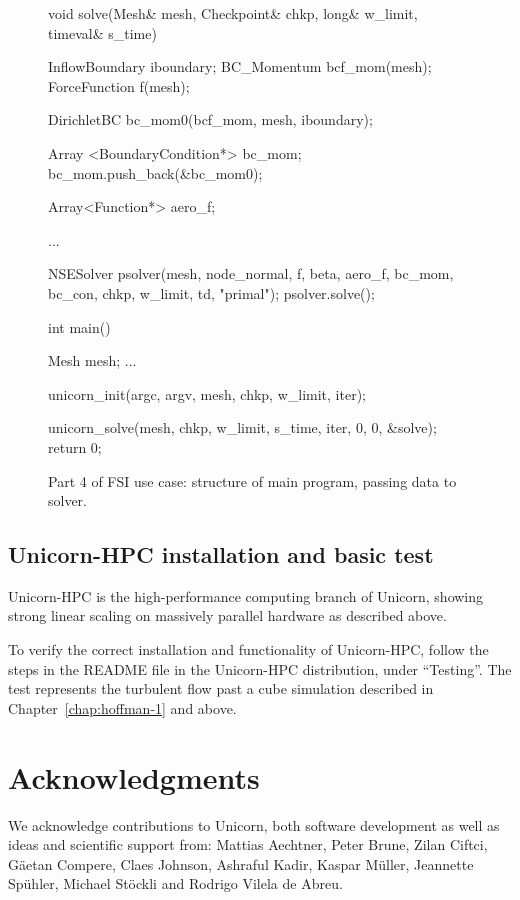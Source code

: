 \begin{figure}
\bwfig
\begin{c++}
void solve(Mesh& mesh, Checkpoint& chkp,
  long& w_limit, timeval& s_time)
{
  InflowBoundary iboundary;
  BC_Momentum bcf_mom(mesh);
  ForceFunction f(mesh);

  DirichletBC bc_mom0(bcf_mom, mesh, iboundary);

  Array <BoundaryCondition*> bc_mom;
  bc_mom.push_back(&bc_mom0);

  Array<Function*> aero_f;

  ...

  NSESolver psolver(mesh, node_normal, f, beta, aero_f,
                    bc_mom, bc_con, chkp, w_limit, td, "primal");
  psolver.solve();
}

int main()
{
  Mesh mesh;
  ...

  unicorn_init(argc, argv, mesh, chkp, w_limit, iter);

  unicorn_solve(mesh, chkp, w_limit, s_time, iter, 0, 0, &solve);
  return 0;
}
\end{c++}
\caption{Part 4 of FSI use case: structure of main program, passing data to solver.}
\label{code:UseCasePart4}
\end{figure}

\subsection{Unicorn-HPC installation and basic test}

Unicorn-HPC is the high-performance computing branch of Unicorn,
showing strong linear scaling on massively parallel hardware as
described above.

To verify the correct installation and functionality of Unicorn-HPC,
follow the steps in the README file in the Unicorn-HPC distribution,
under ``Testing''. The test represents the turbulent flow past a cube
simulation described in Chapter~\ref{chap:hoffman-1} and above.

\section{Acknowledgments}

We acknowledge contributions to Unicorn, both software development as
well as ideas and scientific support from: Mattias Aechtner, Peter
Brune, Zilan Ciftci, G\"aetan Compere, Claes Johnson, Ashraful Kadir, Kaspar M\"uller,
Jeannette Sp\"uhler, Michael St\"ockli and Rodrigo Vilela de Abreu.

